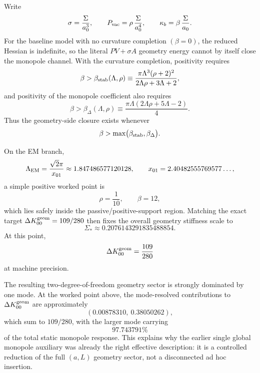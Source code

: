\documentclass[11pt]{article}
\begin{document}
Write
\begin{equation}
\sigma=\frac{\Sigma}{a_0^3},
\qquad
P_{\rm vac}=\rho\,\frac{\Sigma}{a_0^4},
\qquad
\kappa_b=\beta\,\frac{\Sigma}{a_0}.
\label{eq:family1-Sigma-rho-beta}
\end{equation}
For the baseline model with no curvature completion \((\beta=0)\), the reduced Hessian is
indefinite, so the literal \(PV+\sigma A\) geometry energy cannot by itself close the
monopole channel.  With the curvature completion, positivity requires
\begin{equation}
\beta>\beta_{\rm stab}(\Lambda,\rho)
\equiv
\frac{\pi\Lambda^3(\rho+2)^2}{2\Lambda\rho+3\Lambda+2},
\label{eq:family1-beta-stab}
\end{equation}
and positivity of the monopole coefficient also requires
\begin{equation}
\beta>\beta_{\Delta}(\Lambda,\rho)
\equiv
\frac{\pi\Lambda(2\Lambda\rho+5\Lambda-2)}{4}.
\label{eq:family1-beta-delta}
\end{equation}
Thus the geometry-side closure exists whenever
\begin{equation}
\beta>\max\bigl(\beta_{\rm stab},\beta_{\Delta}\bigr).
\label{eq:family1-beta-condition}
\end{equation}

On the EM branch,
\begin{equation}
\Lambda_{\rm EM}=\frac{\sqrt2\pi}{x_{01}}\approx 1.847486577120128,
\qquad
x_{01}=2.40482555769577\ldots,
\label{eq:family1-LambdaEM}
\end{equation}
a simple positive worked point is
\begin{equation}
\rho=\frac{1}{10},
\qquad
\beta=12,
\label{eq:family1-worked-rho-beta}
\end{equation}
which lies safely inside the passive/positive-support region.  Matching the exact target
\(\Delta K_{00}^{\rm geom}=109/280\) then fixes the overall geometry stiffness scale to
\begin{equation}
\Sigma_*\approx 0.2076143291835488854.
\label{eq:family1-Sigma-star}
\end{equation}
At this point,
\begin{equation}
\Delta K_{00}^{\rm geom}=\frac{109}{280}
\label{eq:family1-DeltaK00-match}
\end{equation}
at machine precision.

The resulting two-degree-of-freedom geometry sector is strongly dominated by one mode.
At the worked point above, the mode-resolved contributions to
\(\Delta K_{00}^{\rm geom}\) are approximately
\begin{equation}
(0.00878310,\ 0.38050262),
\label{eq:family1-mode-split}
\end{equation}
which sum to \(109/280\), with the larger mode carrying
\begin{equation}
97.743791\% 
\label{eq:family1-dominant-mode-percent}
\end{equation}
of the total static monopole response.  This explains why the earlier single global
monopole auxiliary was already the right effective description: it is a controlled
reduction of the full \((a,L)\) geometry sector, not a disconnected ad hoc insertion.
\end{document}
